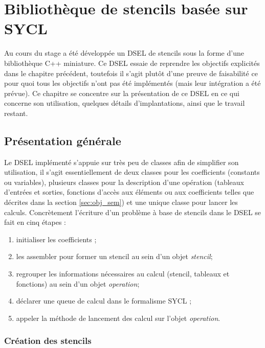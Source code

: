 
\chapter{Bibliothèque de stencils basée sur SYCL}

Au cours du stage a été développée un DSEL de stencils sous la forme d'une bibliothèque \textsf{C++} miniature. Ce DSEL essaie de reprendre les objectifs explicités dans le chapitre précédent, toutefois il s'agit plutôt d'une preuve de faisabilité ce pour quoi tous les objectifs n'ont pas été implémentés (mais leur intégration a été prévue). Ce chapitre se concentre sur la présentation de ce DSEL en ce qui concerne son utilisation, quelques détails d'implantations, ainsi que le travail restant.

\section{Présentation générale}

Le DSEL implémenté s'appuie sur très peu de classes afin de simplifier son utilisation, il s'agit essentiellement de deux classes pour les coefficients (constants ou variables), plusieurs classes pour la description d'une opération (tableaux d'entrées et sorties, fonctions d'accès aux éléments ou aux coefficients telles que décrites dans la section \ref{sec:obj_sem}) et une unique classe pour lancer les calculs. Concrètement l'écriture d'un problème à base de stencils dans le DSEL se fait en cinq étapes :

\begin{enumerate}
\item initialiser les coefficients ;
\item les assembler pour former un stencil au sein d'un objet \emph{stencil};
\item regrouper les informations nécessaires au calcul (stencil, tableaux et fonctions) au sein d'un objet \emph{operation};
\item déclarer une queue de calcul dans le formalisme \textsf{SYCL} ;
\item appeler la méthode de lancement des calcul sur l'objet \emph{operation}.
\end{enumerate}

\subsection{Création des stencils}

